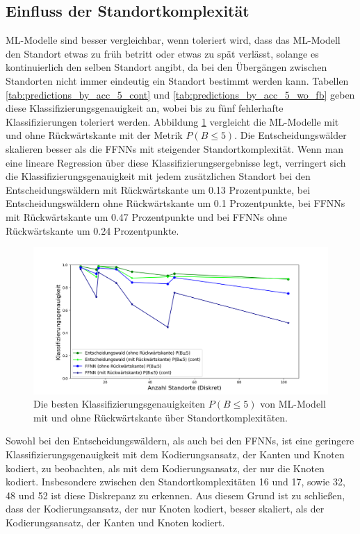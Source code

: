 \subsection{Einfluss der Standortkomplexität}
ML-Modelle sind besser vergleichbar, wenn toleriert wird, dass das ML-Modell den Standort etwas zu früh betritt oder etwas zu spät verlässt,
solange es kontinuierlich den selben Standort angibt, da bei den Übergängen zwischen Standorten nicht immer eindeutig ein Standort bestimmt werden kann.
Tabellen \ref{tab:predictions_by_acc_5_cont} und \ref{tab:predictions_by_acc_5_wo_fb} geben diese Klassifizierungsgenauigkeit an,
wobei bis zu fünf fehlerhafte Klassifizierungen toleriert werden.
\newline
\newline
Abbildung \ref{fig:best_dt_vs_knn_pb_5_vs_pb_5_cont} vergleicht die ML-Modelle mit und ohne Rückwärtskante mit der Metrik $P(B\leq5)$.
Die Entscheidungswälder skalieren besser als die FFNNs mit steigender Standortkomplexität.
Wenn man eine lineare Regression über diese Klassifizierungsergebnisse legt,
verringert sich die Klassifizierungsgenauigkeit mit jedem zusätzlichen Standort bei den Entscheidungswäldern mit Rückwärtskante um 0.13 Prozentpunkte,
bei Entscheidungswäldern ohne Rückwärtskante um 0.1 Prozentpunkte,
bei FFNNs mit Rückwärtskante um 0.47 Prozentpunkte und bei FFNNs ohne Rückwärtskante um 0.24 Prozentpunkte.
\begin{figure}[h!]
    \centering
    \includegraphics[width=\linewidth]{images/best_dt_vs_knn_pb_5_vs_pb_5_cont.png}
    \caption{Die besten Klassifizierungsgenauigkeiten $P(B\leq5)$ von ML-Modell mit und ohne Rückwärtskante über Standortkomplexitäten.}
    \label{fig:best_dt_vs_knn_pb_5_vs_pb_5_cont}
\end{figure}
\newline
\newline
Sowohl bei den Entscheidungswäldern, als auch bei den FFNNs, ist eine geringere Klassifizierungsgenauigkeit mit dem Kodierungsansatz, der Kanten und Knoten kodiert,
zu beobachten, als mit dem Kodierungsansatz, der nur die Knoten kodiert.
Insbesondere zwischen den Standortkomplexitäten 16 und 17, sowie 32, 48 und 52 ist diese Diskrepanz zu erkennen.
Aus diesem Grund ist zu schließen, dass der Kodierungsansatz, der nur Knoten kodiert, besser skaliert, als der Kodierungsansatz, der Kanten und Knoten kodiert.

